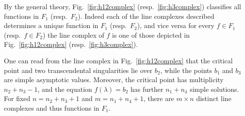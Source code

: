 \documentclass[pdftex]{sigma}
\numberwithin{equation}{section}
\newcommand{\la}{\lambda}
\begin{document}
By the general theory, Fig.~\ref{fig:h12complex} (resp.~\ref{fig:h3complex}) classif\/ies all functions in $F_1$ (resp.~$F_2$). Indeed each of the line complexes described determines a unique function in $F_1$ (resp.~$F_2$), and vice versa for every $f \in F_1$ (resp.~$f \in F_2$) the line complex of $f$ is one of those depicted in Fig.~\ref{fig:h12complex} (resp.~\ref{fig:h3complex}).

One can read from the line complex in Fig.~\ref{fig:h12complex} that the critical point and two transcendental singularities lie over $b_2$, while the points $b_1$ and $b_3$ are simple asymptotic values. Moreover, the critical point has multiplicity $n_2+n_3-1$, and the equation $f(\la)=b_2$ has further $n_1+n_4$ simple solutions. For f\/ixed $n=n_2+n_3+1$ and $m=n_1+n_4+1$, there are $m \times n$ distinct line complexes and thus functions in $F_1$.
\end{document}
